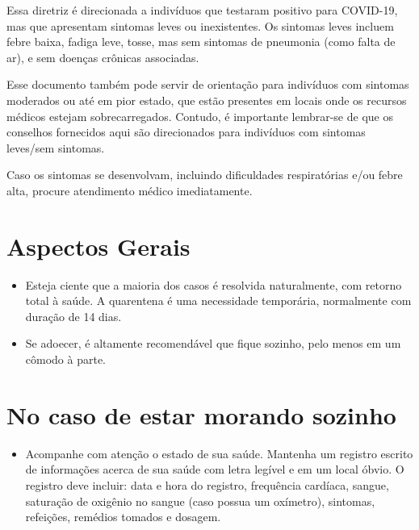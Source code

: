 \documentclass[onecolumn,journal]{IEEEtran}
\begin{document}
\begin{multicols}{2}


Essa diretriz é direcionada a indivíduos que testaram positivo para COVID-19, mas que apresentam sintomas leves ou inexistentes. Os sintomas leves incluem febre baixa, fadiga leve, tosse, mas sem sintomas de pneumonia (como falta de ar), e sem doenças crônicas associadas.
 
Esse documento também pode servir de orientação para indivíduos com sintomas moderados ou até em pior estado, que estão presentes em locais onde os recursos médicos estejam sobrecarregados. Contudo, é importante lembrar-se de que os conselhos fornecidos aqui são direcionados para indivíduos com sintomas leves/sem sintomas.
 
Caso os sintomas se desenvolvam, incluindo dificuldades respiratórias e/ou febre alta, procure atendimento médico imediatamente.


\section*{Aspectos Gerais}
\begin{itemize}
\item  Esteja ciente que a maioria dos casos é resolvida naturalmente, com retorno total à saúde. A quarentena é uma necessidade temporária, normalmente com duração de 14 dias.

\item Se adoecer, é altamente recomendável que fique sozinho, pelo menos em um cômodo à parte.

\end{itemize}

\section*{No caso de estar morando sozinho}
\begin{itemize}
\item Acompanhe com atenção o estado de sua saúde. Mantenha um registro escrito de informações acerca de sua saúde com letra legível e em um local óbvio. O registro deve incluir: data e hora do registro, frequência cardíaca, sangue, saturação de oxigênio no sangue (caso possua um oxímetro), sintomas, refeições, remédios tomados e dosagem.


\end{itemize}
\end{multicols}
\end{document}
